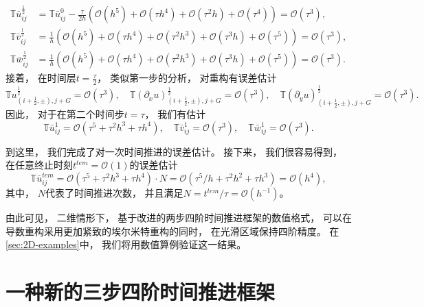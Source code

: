 \begin{align}
  {\mathbb{T}} \bar u_{ij}^{\frac 12} & = {\mathbb{T}} \bar u_{ij}^{0} - \frac{\tau}{2h} \left({\mathcal{O}}(h^5) + {\mathcal{O}}(\tau h^4) + {\mathcal{O}}(\tau^2 h) + {\mathcal{O}}(\tau^4)\right) = {\mathcal{O}}(\tau^3), \\
  {\mathbb{T}} \bar v_{ij}^{\frac 12} & = \frac{1}{h}\left({\mathcal{O}}(h^5) + {\mathcal{O}}(\tau h^4) + {\mathcal{O}}(\tau^2 h^3) + {\mathcal{O}}(\tau^3 h) + {\mathcal{O}}(\tau^5)\right) = {\mathcal{O}}(\tau^3),         \\
  {\mathbb{T}} \bar w_{ij}^{\frac 12} & = \frac{1}{h}\left({\mathcal{O}}(h^5) + {\mathcal{O}}(\tau h^4) + {\mathcal{O}}(\tau^2 h^3) + {\mathcal{O}}(\tau^3 h) + {\mathcal{O}}(\tau^5)\right) = {\mathcal{O}}(\tau^3).
\end{align}
接着，
在时间层$t=\frac \tau 2$，
类似第一步的分析，
对重构有误差估计
\begin{equation}
  {\mathbb{T}} u_{(i+\frac{1}{2},\pm), j+G}^{\frac 12} = {\mathcal{O}}(\tau^3), \quad
  {\mathbb{T}}\left({\partial_{x}} u\right)_{(i+\frac{1}{2},\pm), j+G}^{\frac 12} = {\mathcal{O}}(\tau^3), \quad
  {\mathbb{T}}\left({\partial_{y}} u\right)_{(i+\frac{1}{2},\pm), j+G}^{\frac 12} = {\mathcal{O}}(\tau^3).
\end{equation}
因此，
对于在第二个时间步$t=\tau$，
我们有估计
\begin{equation}
  {\mathbb{T}} \bar{u}_{ij}^{1} = {\mathcal{O}}(\tau^5+\tau^2 h^3+\tau h^4), \quad
  {\mathbb{T}} \bar v_{ij}^{1 } = {\mathcal{O}}(\tau^3), \quad
  {\mathbb{T}} \bar w_{ij}^{1 } = {\mathcal{O}}(\tau^3).
\end{equation}

到这里，
我们完成了对一次时间推进的误差估计。
接下来，
我们很容易得到，
在任意终止时刻$t^{tem}={\mathcal{O}}(1)$的误差估计
\begin{equation}
  \label{eq:1D-final-Taylor}
  {\mathbb{T}} \bar{u}_{ij}^{tem} = {\mathcal{O}}(\tau^5+\tau^2 h^3+\tau h^4) \cdot N = {\mathcal{O}}(\tau^5/h+\tau^2 h^2+\tau h^3) = {\mathcal{O}}(h^4),
\end{equation}
其中，
$N$代表了时间推进次数，
并且满足$N=t^{tem}/\tau={\mathcal{O}}(h^{-1})$。

由此可见，
二维情形下，
基于改进的两步四阶时间推进框架的数值格式，
可以在导数重构采用更加紧致的埃尔米特重构的同时，
在光滑区域保持四阶精度。
在\cref{sec:2D-examples}中，
我们将用数值算例验证这一结果。

\section{一种新的三步四阶时间推进框架}

